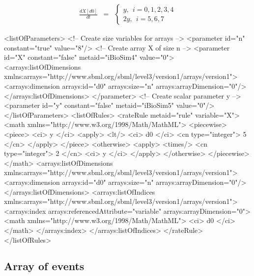 \begin{eqnarray*}
\frac{dX[d0]}{dt} & = & \left\{ \begin{array}{l}
  y,~~i = 0, 1, 2, 3, 4 \\
 2y,~~i = 5, 6, 7 
\end{array}
\right.
\end{eqnarray*}
\begin{example}
<listOfParameters>
    <!-- Create size variables for arrays -->
    <parameter id="n" constant="true" value="8"/>
    <!-- Create array X of size n -->
    <parameter id="X" constant="false" metaid="iBioSim4" value="0">
        <arrays:listOfDimensions
            xmlns:arrays="http://www.sbml.org/sbml/level3/version1/arrays/version1">
            <arrays:dimension arrays:id="d0" arrays:size="n" arrays:arrayDimension="0"/>
        </arrays:listOfDimensions>
    </parameter>
    <!-- Create scalar parameter y -->
    <parameter id="y" constant="false" metaid="iBioSim5" value="0"/>
</listOfParameters>
<listOfRules>
    <rateRule metaid="rule" variable="X">
        <math xmlns="http://www.w3.org/1998/Math/MathML">
            <piecewise>
                <piece>
                    <ci> y </ci>
                    <apply>
                        <lt/>
                        <ci> d0 </ci>
                        <cn type="integer"> 5 </cn>
                    </apply>
                </piece>
                <otherwise>
                    <apply>
                        <times/>
                        <cn type="integer"> 2 </cn>
                        <ci> y </ci>
                    </apply>
                </otherwise>
            </piecewise>
        </math>
        <arrays:listOfDimensions
            xmlns:arrays="http://www.sbml.org/sbml/level3/version1/arrays/version1">
            <arrays:dimension arrays:id="d0" arrays:size="n" arrays:arrayDimension="0"/>
        </arrays:listOfDimensions>
        <arrays:listOfIndices
            xmlns:arrays="http://www.sbml.org/sbml/level3/version1/arrays/version1">
            <arrays:index arrays:referencedAttribute="variable" arrays:arrayDimension="0">
                <math xmlns="http://www.w3.org/1998/Math/MathML">
                    <ci> d0 </ci>
                </math>
            </arrays:index>
        </arrays:listOfIndices>
    </rateRule>
</listOfRules>
\end{example}

\subsection{Array of events}

